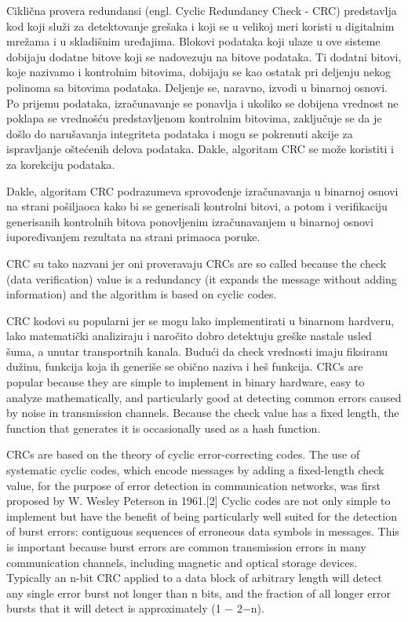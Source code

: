 \documentclass[12pt,oneside]{memoir}
\begin{document}
Ciklična provera redundansi (engl. Cyclic Redundancy Check - CRC) predstavlja kod koji služi za 
detektovanje grešaka i koji se u velikoj meri koristi u digitalnim mrežama i u skladišnim 
uređajima. Blokovi podataka koji ulaze u ove sisteme dobijaju dodatne bitove koji se nadovezuju 
na bitove podataka. Ti dodatni bitovi, koje nazivamo i kontrolnim bitovima, dobijaju se kao 
ostatak pri deljenju nekog polinoma sa bitovima podataka. Deljenje se, naravno, izvodi u binarnoj 
osnovi. Po prijemu podataka, izračunavanje se ponavlja i ukoliko se dobijena vrednost ne poklapa 
se vrednošću predstavljenom kontrolnim bitovima, zaključuje se da je došlo do narušavanja 
integriteta podataka i mogu se pokrenuti akcije za ispravljanje oštećenih delova podataka. Dakle, 
algoritam CRC se može koristiti i za korekciju podataka.

Dakle, algoritam CRC podrazumeva sprovođenje izračunavanja u binarnoj osnovi na strani pošiljaoca kako bi se generisali kontrolni bitovi, a potom i verifikaciju generisanih kontrolnih bitova ponovljenim izračunavanjem u binarnoj osnovi iupoređivanjem rezultata na strani primaoca poruke. 

CRC su tako nazvani jer oni proveravaju 
CRCs are so called because the check (data verification) value is a redundancy (it expands the 
message without adding information) and the algorithm is based on cyclic codes. 

CRC kodovi su popularni jer se mogu lako implementirati u binarnom hardveru, lako matematički analiziraju i naročito dobro detektuju greške nastale usled šuma, a unutar transportnih kanala. Budući da check vrednosti imaju fiksiranu dužinu, funkcija koja ih generiše se obično naziva i heš funkcija.
CRCs are popular because they are simple to implement in binary hardware, easy to analyze mathematically, and particularly good at detecting common errors caused by noise in transmission channels. Because the check value has a fixed length, the function that generates it is occasionally used as a hash function. 

CRCs are based on the theory of cyclic error-correcting codes. The use of systematic cyclic 
codes, which encode messages by adding a fixed-length check value, for the purpose of error 
detection in communication networks, was first proposed by W. Wesley Peterson in 1961.[2] Cyclic 
codes are not only simple to implement but have the benefit of being particularly well suited for 
the detection of burst errors: contiguous sequences of erroneous data symbols in messages. This 
is important because burst errors are common transmission errors in many communication channels, 
including magnetic and optical storage devices. Typically an n-bit CRC applied to a data block of 
arbitrary length will detect any single error burst not longer than n bits, and the fraction of 
all longer error bursts that it will detect is approximately (1 − 2−n).
\end{document}

